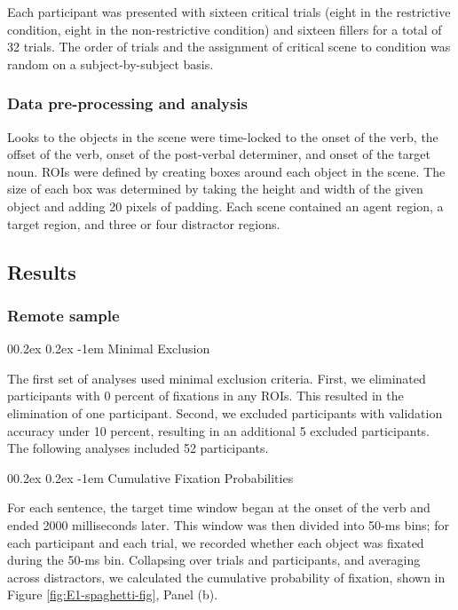 \documentclass[
  man,floatsintext]{apa6}
\makeatletter
\let\oldparagraph\paragraph
\renewcommand{\paragraph}[1]{\oldparagraph{#1}\mbox{}}
\renewcommand{\paragraph}{\@startsection{paragraph}{4}{\parindent}%
  {0\baselineskip \@plus 0.2ex \@minus 0.2ex}%
  {-1em}%
  {\normalfont\normalsize\bfseries\itshape\typesectitle}}
\makeatother
\begin{document}
Each participant was presented with sixteen critical trials (eight in
the restrictive condition, eight in the non-restrictive condition) and
sixteen fillers for a total of 32 trials. The order of trials and the
assignment of critical scene to condition was random on a
subject-by-subject basis.

\subsubsection{Data pre-processing and analysis}\label{data-pre-processing-and-analysis}

Looks to the objects in the scene were time-locked to the onset of the
verb, the offset of the verb, onset of the post-verbal determiner, and
onset of the target noun. ROIs were defined by creating boxes around each object in the scene. The size of each box was determined by taking the height and width of the given object and adding 20 pixels of padding. Each scene contained an agent region, a target region, and three or four distractor regions.

\subsection{Results}\label{results}

\subsubsection{Remote sample}\label{remote-sample-1}

\paragraph{Minimal Exclusion}\label{minimal-exclusion}

The first set of analyses used minimal exclusion criteria. First, we eliminated participants with 0 percent of fixations in any ROIs. This resulted in the elimination of one participant. Second, we excluded participants with validation accuracy under 10 percent, resulting in an additional 5 excluded participants. The following analyses included 52 participants.

\paragraph{Cumulative Fixation Probabilities}\label{cumulative-fixation-probabilities}

For each sentence, the target time window began at the onset of the verb and ended 2000 milliseconds later. This window was then divided into 50-ms bins; for each participant and each trial, we recorded whether each object was fixated during the 50-ms bin. Collapsing over trials and participants, and averaging across distractors, we calculated the cumulative probability of fixation, shown in Figure \ref{fig:E1-spaghetti-fig}, Panel (b).
\end{document}
